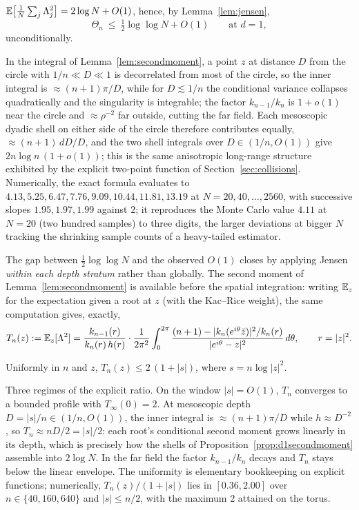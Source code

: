 \begin{proposition}\label{prop:d1secondmoment}
  $\mathbb{E}\bigl[\frac1N\sum_j\Lambda_j^2\bigr] = 2\log N + O(1)$, hence, by
  Lemma~\ref{lem:jensen},
  \[
    \Theta_n \ \le\ \tfrac12\log\log N + O(1) \qquad \text{at } d=1,
  \]
  unconditionally.
\end{proposition}

\proofsketch
In the integral of Lemma~\ref{lem:secondmoment}, a point $z$ at distance $D$ from the circle
with $1/n\ll D\ll1$ is decorrelated from most of the circle, so the inner integral is
$\approx(n+1)\pi/D$, while for $D\lesssim1/n$ the conditional variance collapses
quadratically and the singularity is integrable; the factor $k_{n-1}/k_n$ is $1+o(1)$ near
the circle and $\approx\rho^{-2}$ far outside, cutting the far field. Each mesoscopic dyadic
shell on either side of the circle therefore contributes equally, $\approx(n+1)\,dD/D$, and
the two shell integrals over $D\in(1/n,O(1))$ give $2n\log n\,(1+o(1))$; this is the same
anisotropic long-range structure exhibited by the explicit two-point function of
Section~\ref{sec:collisions}. Numerically, the exact formula evaluates to
$4.13, 5.25, 6.47, 7.76, 9.09, 10.44, 11.81, 13.19$ at $N=20,40,\dots,2560$, with
successive slopes $1.95, 1.97, 1.99$ against $2$; it reproduces the Monte Carlo value $4.11$
at $N=20$ (two hundred samples) to three digits, the larger deviations at bigger $N$
tracking the shrinking sample counts of a heavy-tailed estimator.
\endproof

The gap between $\frac12\log\log N$ and the observed $O(1)$ closes by applying Jensen
\emph{within each depth stratum} rather than globally. The second moment of
Lemma~\ref{lem:secondmoment} is available before the spatial integration: writing $\mathbb{E}_z$ for
the expectation given a root at $z$ (with the Kac--Rice weight), the same computation gives,
exactly,
\[
  T_n(z) := \mathbb{E}_z[\Lambda^2]
  = \frac{k_{n-1}(r)}{k_n(r)\,h(r)}\cdot\frac1{2\pi^2}
  \int_0^{2\pi}\frac{(n+1) - |k_n(e^{i\theta}\bar z)|^2/k_n(r)}{|e^{i\theta}-z|^2}\,d\theta,
  \qquad r=|z|^2.
\]

\begin{proposition}\label{prop:stratified}
  Uniformly in $n$ and $z$, $T_n(z)\le2\,(1+|s|)$, where $s=n\log|z|^2$.
\end{proposition}

\proofsketch
Three regimes of the explicit ratio. On the window $|s|=O(1)$, $T_n$ converges to a bounded
profile with $T_\infty(0)=2$. At mesoscopic depth $D=|s|/n\in(1/n,O(1))$, the inner
integral is $\approx(n+1)\pi/D$ while $h\approx D^{-2}$, so $T_n\approx nD/2 = |s|/2$: each
root's conditional second moment grows linearly in its depth, which is precisely how the
shells of Proposition~\ref{prop:d1secondmoment} assemble into $2\log N$. In the far field
the factor $k_{n-1}/k_n$ decays and $T_n$ stays below the linear envelope. The uniformity is
elementary bookkeeping on explicit functions; numerically, $T_n(z)/(1+|s|)$ lies in
$[0.36,2.00]$ over $n\in\{40,160,640\}$ and $|s|\le n/2$, with the maximum $2$ attained on
the torus.
\endproof

